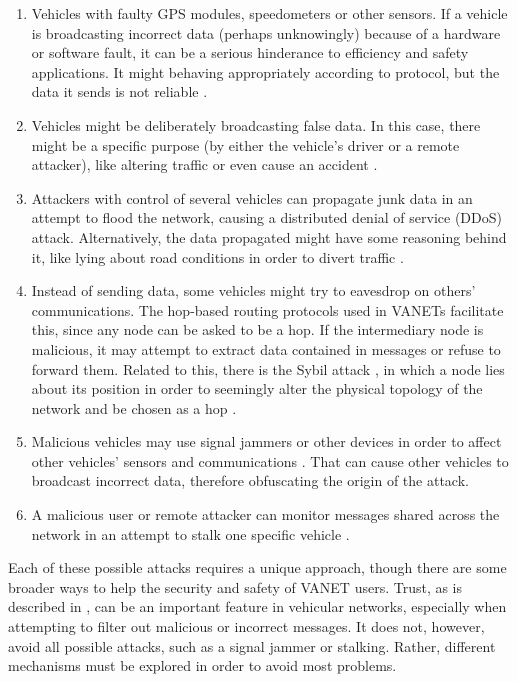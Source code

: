 \begin{enumerate}
	\item 	Vehicles with faulty GPS modules, speedometers or other sensors.
			If a vehicle is broadcasting incorrect data (perhaps unknowingly) because of a hardware or software fault, it can be a serious hinderance to efficiency and safety applications.
			It might behaving appropriately according to protocol, but the data it sends is not reliable \citep{isaac2010security}.
	\item	Vehicles might be deliberately broadcasting false data.
			In this case, there might be a specific purpose (by either the vehicle's driver or a remote attacker), like altering traffic or even cause an accident \citep{golle2004detecting}.
	\item   Attackers with control of several vehicles can propagate junk data in an attempt to flood the network, causing a distributed denial of service (DDoS) attack.
			Alternatively, the data propagated might have some reasoning behind it, like lying about road conditions in order to divert traffic \citep{garip2015congestion}.
	\item	Instead of sending data, some vehicles might try to eavesdrop on others' communications.
			The hop-based routing protocols used in VANETs facilitate this, since any node can be asked to be a hop.
			If the intermediary node is malicious, it may attempt to extract data contained in messages or refuse to forward them.
			Related to this, there is the Sybil attack \citep{isaac2010security}, in which a node lies about its position in order to seemingly alter the physical topology of the network and be chosen as a hop \citep{leinmuller2005influence}.
	\item	Malicious vehicles may use signal jammers or other devices in order to affect other vehicles' sensors and communications \citep{isaac2010security}.
			That can cause other vehicles to broadcast incorrect data, therefore obfuscating the origin of the attack.
	\item	A malicious user or remote attacker can monitor messages shared across the network in an attempt to stalk one specific vehicle \citep{isaac2010security}.
	
\end{enumerate}

Each of these possible attacks requires a unique approach, though there are some broader ways to help the security and safety of VANET users.
Trust, as is described in , can be an important feature in vehicular networks, especially when attempting to filter out malicious or incorrect messages.
It does not, however, avoid all possible attacks, such as a signal jammer or stalking.
Rather, different mechanisms must be explored in order to avoid most problems.

